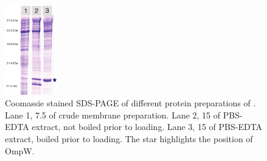 \begin{figure}[H]
  	\begin{center}
   		\includegraphics[width=0.2\textwidth]{porin_chapter/img/Fig1-pbsedta.pdf}
   	\end{center}
   	\caption[Coomassie stained \ac{SDS-PAGE} of different protein preparations of \caulobacter.]{
	   	Coomassie stained \ac{SDS-PAGE} of different protein preparations of \caulobacter. 
Lane 1, 7.5 \microlitre of crude membrane preparation. Lane 2, 15 \microlitre of \ac{PBS}-\ac{EDTA} extract, not boiled prior to loading. Lane 3, 15 \microlitre of \ac{PBS}-\ac{EDTA} extract, boiled prior to loading. The star highlights the position of OmpW.
 	}
   	\label{fig:porin-pbsedtagel}
\end{figure}   

